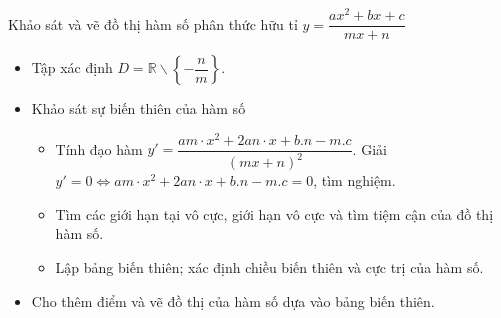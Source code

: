 \begin{dang}{Khảo sát và vẽ đồ thị hàm số phân thức hữu tỉ $y=\dfrac{ax^2+bx+c}{mx+n}$}
	\begin{itemize}
		\item[\iconCH]  Tập xác định $D=\mathbb{R}\backslash \left\{-\dfrac{n}{m}\right\}$.
		\item [\iconCH]  Khảo sát sự biến thiên của hàm số
		\begin{itemize}
			\item Tính đạo hàm $y'=\dfrac{am\cdot x^2+2an\cdot x + b.n - m.c}{(mx+n)^2}$. Giải $y'=0 \Leftrightarrow am\cdot x^2+2an\cdot x + b.n - m.c=0$, tìm nghiệm.
			\item Tìm các giới hạn tại vô cực, giới hạn vô cực và tìm tiệm cận của đồ thị hàm số.
			\item Lập bảng biến thiên; xác định chiều biến thiên và cực trị của hàm số.
		\end{itemize}
		\item [\iconCH]  Cho thêm điểm và vẽ đồ thị của hàm số dựa vào bảng biến thiên.
	\end{itemize}
\end{dang}
